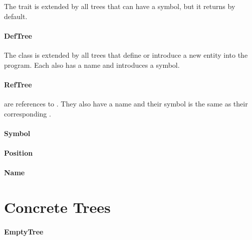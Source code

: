 \noindent The  trait is extended by all trees that can have a symbol, but it returns  by default.

\paragraph{DefTree} \hfill \begin{footnotesize}\end{footnotesize} \newline

\noindent The  class is extended by all trees that define or introduce a new entity into the program. Each  also has a name and introduces a symbol.

\paragraph{RefTree} \hfill \begin{footnotesize}\end{footnotesize} \newline

\noindent {} are references to . They also have a name and their symbol is the same as their corresponding .

\paragraph{Symbol}

\paragraph{Position}

\paragraph{Name}

\section{Concrete Trees}

\paragraph{EmptyTree} \hfill \begin{footnotesize}\end{footnotesize} \newline

